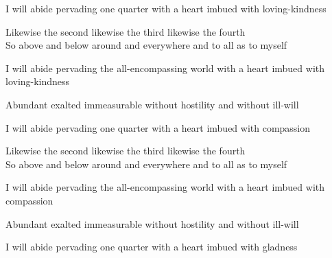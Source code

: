 \begin{english-hang}
I will abide pervading one quarter with a heart imbued with loving-kindness\\
\end{english-hang}

\begin{english}
Likewise the second likewise the third likewise the fourth\\
So above and below around and everywhere and to all as to myself\\
\end{english}

\begin{english-hang}
I will abide pervading the all-encompassing world with a heart imbued with loving-kindness\\
\end{english-hang}

\begin{english-hang}
Abundant exalted immeasurable without hostility and without ill-will
\end{english-hang}

\medskip

\begin{english-hang}
I will abide pervading one quarter with a heart imbued with compassion\\
\end{english-hang}

\begin{english}
Likewise the second likewise the third likewise the fourth\\
So above and below around and everywhere and to all as to myself\\
\end{english}

\begin{english-hang}
I will abide pervading the all-encompassing world with a heart imbued with compassion\\
\end{english-hang}

\begin{english-hang}
Abundant exalted immeasurable without hostility and without ill-will
\end{english-hang}

\medskip

\begin{english-hang}
I will abide pervading one quarter with a heart imbued with gladness\\
\end{english-hang}

